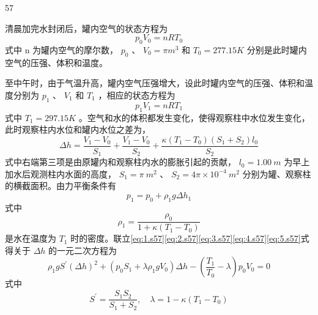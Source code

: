 \begin{solution}{57}
    \begin{subsolution}
        清晨加完水封闭后，罐内空气的状态方程为
        \begin{equation}
            p _ {0} V _ {0} = n R T _ {0}
            \label{eq:1.s57}
        \end{equation}
        式中 n 为罐内空气的摩尔数， $p_{0}$ 、 $V_{0}=\pi m^{3}$ 和 $T_{0}=277.15K$ 分别是此时罐内空气的压强、体积和温度。

        至中午时，由于气温升高，罐内空气压强增大，设此时罐内空气的压强、体积和温度分别为 $p_{1}$ 、 $V_{1}$ 和 $T_{1}$ ，相应的状态方程为
        \begin{equation}
            p _ {1} V _ {1} = n R T _ {1}
            \label{eq:2.s57}
        \end{equation}
        式中 $T_{1}=297.15K$ 。空气和水的体积都发生变化，使得观察柱中水位发生变化，此时观察柱内水位和罐内水位之差为，
        \begin{equation}
            \Delta h = \frac {V _ {1} - V _ {0}}{S _ {1}} + \frac {V _ {1} - V _ {0}}{S _ {2}} + \frac {\kappa (T _ {1} - T _ {0}) (S _ {1} + S _ {2}) l _ {0}}{S _ {2}}
            \label{eq:3.s57}
        \end{equation}
        式中右端第三项是由原罐内和观察柱内水的膨胀引起的贡献， $l_{0}=1.00\ m$ 为早上加水后观测柱内水面的高度， $S_{1}=\pi\ m^{2}$ 、 $S_{2}=4\pi\times10^{-4}\ m^{2}$ 分别为罐、观察柱的横截面积。由力平衡条件有
        \begin{equation}
            p _ {1} = p _ {0} + \rho_{1} g \Delta h _ {1}
            \label{eq:4.s57}
        \end{equation}
        式中
        \begin{equation}
            \rho_{1} = \frac {\rho_{0}}{1 + \kappa (T _ {1} - T _ {0})}
            \label{eq:5.s57}
        \end{equation}
        是水在温度为 $T_{1}$ 时的密度。联立\eqref{eq:1.s57}\eqref{eq:2.s57}\eqref{eq:3.s57}\eqref{eq:4.s57}\eqref{eq:5.s57}式得关于 $\Delta h$ 的一元二次方程为
        \begin{equation}
            \rho_{1} g S^{\prime} (\Delta h)^{2} + \left(p _ {0} S _ {1} + \lambda \rho_{1} g V _ {0}\right) \Delta h - \left(\frac {T _ {1}}{T _ {0}} - \lambda\right) p _ {0} V _ {0} = 0
            \label{eq:6.s57}
        \end{equation}
        式中
        \begin{equation}
            S^{\prime} = \frac {S _ {1} S _ {2}}{S _ {1} + S _ {2}}, \quad \lambda = 1 - \kappa (T _ {1} - T _ {0})

\end{equation}
\end{subsolution}
\end{solution}
